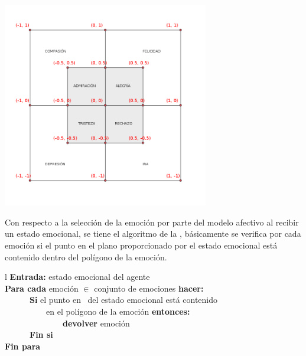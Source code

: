 \begin{ilustracion}[fuente=\yo, etiqueta=modelo-afectivo-puntos, titulo={Representación Gráfica de los Puntos que Conforman los Polígonos de las Emociones}]
\includegraphics[width=9cm]{ilustraciones/propuesta/modelo-afectivo.png}
\end{ilustracion}

Con respecto a la selección de la emoción por parte del modelo afectivo al recibir un estado emocional,
se tiene el algoritmo de la , básicamente se
verifica por cada emoción si el punto en el plano proporcionado por el estado emocional
está contenido dentro del polígono de la emoción.

\begin{cuadro}[etiqueta=algoritmo-modelo-afectivo, titulo={Algoritmo del Modelo Afectivo Para la Selección de Una Emoción}]{l}
\toprule
\textbf{Entrada:} estado emocional del agente \\
\midrule
\textbf{Para cada} emoción \textbf{$\in$} conjunto de emociones \textbf{hacer:} \\
~~~~~~\textbf{Si} el punto en \Rcuadrado~del estado emocional está contenido \\
~~~~~~~~~~en el polígono de la emoción \textbf{entonces:} \\
~~~~~~~~~~~~~~\textbf{devolver} emoción \\
~~~~~~\textbf{Fin si} \\
\textbf{Fin para} \\
\bottomrule
{}
\end{cuadro}



